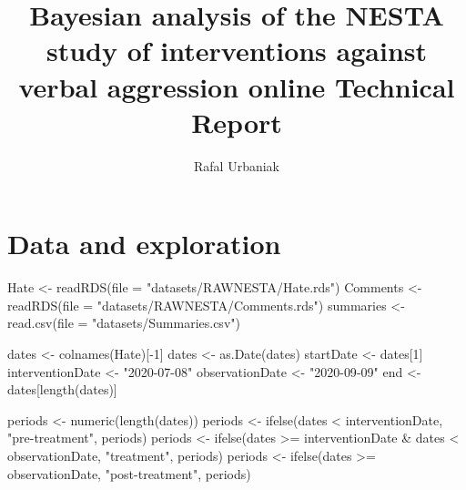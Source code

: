 \documentclass[
  10pt,
  dvipsnames, enabledeprecatedfontcommands]{scrartcl}
\title{Bayesian analysis of the NESTA study of interventions against
verbal aggression online \linebreak  Technical Report}
\author{Rafal Urbaniak}
\date{}
\newenvironment{Shaded}{\begin{snugshade}}{\end{snugshade}}
\newcommand{\AttributeTok}[1]{\textcolor[rgb]{0.77,0.63,0.00}{#1}}
\newcommand{\DecValTok}[1]{\textcolor[rgb]{0.00,0.00,0.81}{#1}}
\newcommand{\FunctionTok}[1]{\textcolor[rgb]{0.00,0.00,0.00}{#1}}
\newcommand{\NormalTok}[1]{#1}
\newcommand{\OtherTok}[1]{\textcolor[rgb]{0.56,0.35,0.01}{#1}}
\newcommand{\SpecialCharTok}[1]{\textcolor[rgb]{0.00,0.00,0.00}{#1}}
\newcommand{\StringTok}[1]{\textcolor[rgb]{0.31,0.60,0.02}{#1}}
\begin{document}
\maketitle

\tableofcontents

\hypertarget{data-and-exploration}{%
\section{Data and exploration}\label{data-and-exploration}}

\vspace{1mm}
\scriptsize

\begin{Shaded}
\begin{Highlighting}[]
\NormalTok{Hate }\OtherTok{\textless{}{-}} \FunctionTok{readRDS}\NormalTok{(}\AttributeTok{file =} \StringTok{"datasets/RAWNESTA/Hate.rds"}\NormalTok{)}
\NormalTok{Comments }\OtherTok{\textless{}{-}} \FunctionTok{readRDS}\NormalTok{(}\AttributeTok{file =} \StringTok{"datasets/RAWNESTA/Comments.rds"}\NormalTok{)}
\NormalTok{summaries }\OtherTok{\textless{}{-}} \FunctionTok{read.csv}\NormalTok{(}\AttributeTok{file =} \StringTok{"datasets/Summaries.csv"}\NormalTok{)}

\NormalTok{dates }\OtherTok{\textless{}{-}} \FunctionTok{colnames}\NormalTok{(Hate)[}\SpecialCharTok{{-}}\DecValTok{1}\NormalTok{]}
\NormalTok{dates }\OtherTok{\textless{}{-}} \FunctionTok{as.Date}\NormalTok{(dates)}
\NormalTok{startDate }\OtherTok{\textless{}{-}}\NormalTok{ dates[}\DecValTok{1}\NormalTok{]}
\NormalTok{interventionDate }\OtherTok{\textless{}{-}} \StringTok{"2020{-}07{-}08"}
\NormalTok{observationDate }\OtherTok{\textless{}{-}} \StringTok{"2020{-}09{-}09"}
\NormalTok{end }\OtherTok{\textless{}{-}}\NormalTok{ dates[}\FunctionTok{length}\NormalTok{(dates)]}

\NormalTok{periods }\OtherTok{\textless{}{-}} \FunctionTok{numeric}\NormalTok{(}\FunctionTok{length}\NormalTok{(dates))}
\NormalTok{periods }\OtherTok{\textless{}{-}} \FunctionTok{ifelse}\NormalTok{(dates }\SpecialCharTok{\textless{}}\NormalTok{ interventionDate, }\StringTok{"pre{-}treatment"}\NormalTok{, periods)}
\NormalTok{periods }\OtherTok{\textless{}{-}} \FunctionTok{ifelse}\NormalTok{(dates }\SpecialCharTok{\textgreater{}=}\NormalTok{ interventionDate }\SpecialCharTok{\&}\NormalTok{ dates }\SpecialCharTok{\textless{}}\NormalTok{ observationDate,}
    \StringTok{"treatment"}\NormalTok{, periods)}
\NormalTok{periods }\OtherTok{\textless{}{-}} \FunctionTok{ifelse}\NormalTok{(dates }\SpecialCharTok{\textgreater{}=}\NormalTok{ observationDate, }\StringTok{"post{-}treatment"}\NormalTok{, periods)}


\end{Highlighting}
\end{Shaded}
\end{document}
